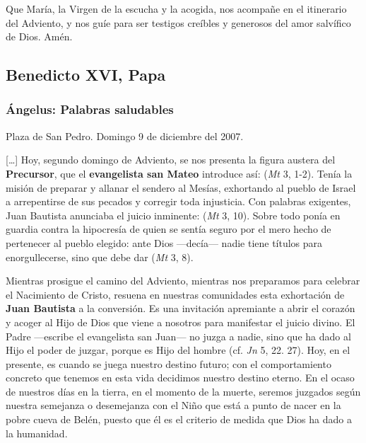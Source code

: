 \begin{body}
\begin{body}
	Que María, la Virgen de la escucha y la acogida, nos acompañe en el itinerario del Adviento, y nos guíe para ser testigos creíbles y generosos del amor salvífico de Dios. Amén.
	

\subsection{Benedicto XVI, Papa}

\subsubsection{Ángelus: Palabras saludables}

Plaza de San Pedro. Domingo 9 de diciembre del 2007.

[\ldots{}] Hoy, segundo domingo de Adviento, se nos presenta la figura austera del \textbf{Precursor}, que el \textbf{evangelista san Mateo} introduce así:  (\emph{Mt} 3, 1-2). Tenía la misión de preparar y allanar el sendero al Mesías, exhortando al pueblo de Israel a arrepentirse de sus pecados y corregir toda injusticia. Con palabras exigentes, Juan Bautista anunciaba el juicio inminente:  (\emph{Mt} 3, 10). Sobre todo ponía en guardia contra la hipocresía de quien se sentía seguro por el mero hecho de pertenecer al pueblo elegido: ante Dios ---decía--- nadie tiene títulos para enorgullecerse, sino que debe dar  (\emph{Mt} 3, 8).

Mientras prosigue el camino del Adviento, mientras nos preparamos para celebrar el Nacimiento de Cristo, resuena en nuestras comunidades esta exhortación de \textbf{Juan Bautista} a la conversión. Es una invitación apremiante a abrir el corazón y acoger al Hijo de Dios que viene a nosotros para manifestar el juicio divino. El Padre ---escribe el evangelista san Juan--- no juzga a nadie, sino que ha dado al Hijo el poder de juzgar, porque es Hijo del hombre (cf. \emph{Jn} 5, 22. 27). Hoy, en el presente, es cuando se juega nuestro destino futuro; con el comportamiento concreto que tenemos en esta vida decidimos nuestro destino eterno. En el ocaso de nuestros días en la tierra, en el momento de la muerte, seremos juzgados según nuestra semejanza o desemejanza con el Niño que está a punto de nacer en la pobre cueva de Belén, puesto que él es el criterio de medida que Dios ha dado a la humanidad.


\end{body}
\end{body}
